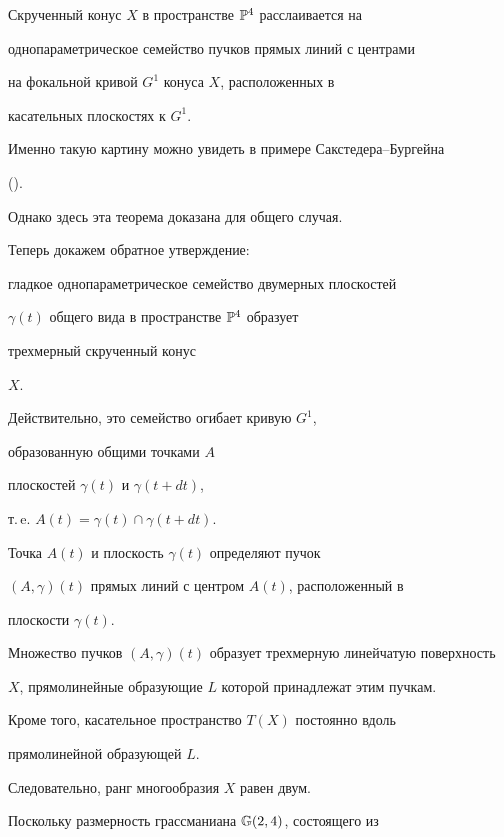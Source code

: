 \begin{thm}


Скрученный конус $X$ в пространстве ${\Bbb P}^4$ расслаивается на


однопараметрическое семейство пучков прямых линий с центрами


на фокальной кривой $G^1$ конуса $X$, расположенных в


касательных плоскостях к $G^1$.


\end{thm}





Именно такую картину можно увидеть в примере Сакстедера--Бургейна


(\cite{AG01a}).


Однако здесь эта теорема доказана для общего случая.





Теперь докажем обратное утверждение:


гладкое однопараметрическое семейство двумерных плоскостей


$\gamma (t)$ общего вида в пространстве ${\Bbb P}^4$ образует


трехмерный скрученный конус


$X$.


Действительно, это семейство огибает кривую $G^1$,


образованную общими точками $A$


плоскостей $\gamma (t)$ и  $\gamma (t + dt)$,


т.\,e. $A (t) =  \gamma (t) \cap \gamma (t+dt)$.


Точка $A (t)$ и плоскость  $\gamma (t)$ определяют пучок


$(A, \gamma) (t)$ прямых линий с центром $A (t)$, расположенный в


плоскости  $\gamma (t)$.


Множество пучков $(A, \gamma) (t)$ образует трехмерную линейчатую поверхность


$X$, прямолинейные образующие $L$ которой принадлежат этим пучкам.


Кроме того, касательное пространство $T (X)$ постоянно вдоль


прямолинейной образующей $L$.


Следовательно, ранг многообразия $X$ равен двум.





Поскольку размерность грассманиана ${\Bbb G} (2, 4)$, состоящего из


